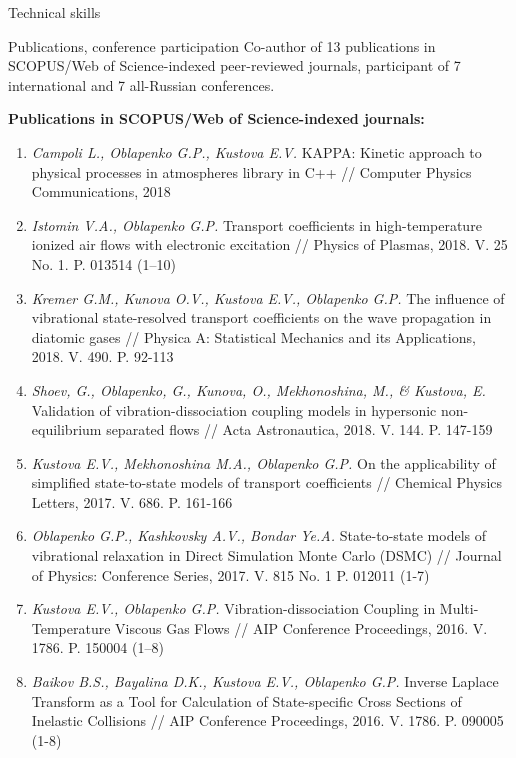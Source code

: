 \documentclass{resume} %
\begin{document}
\begin{rSection}{Technical skills}
\pagebreak

\begin{rSection}{Publications, conference participation}
Co-author of 13 publications in SCOPUS/Web of Science-indexed peer-reviewed journals, participant of 7 international and 7 all-Russian conferences.

{\bf Publications in SCOPUS/Web of Science-indexed journals:}

\begin{enumerate}
\item \emph{Campoli L., Oblapenko G.P., Kustova E.V.} KAPPA: Kinetic approach to physical processes in atmospheres library in C++ // Computer Physics Communications, 2018

\item \emph{Istomin V.A., Oblapenko G.P.} Transport coefficients in high-temperature ionized air flows with electronic excitation // Physics of Plasmas, 2018. V. 25 No. 1. P. 013514 (1--10)

\item \emph{Kremer G.M., Kunova O.V., Kustova E.V., Oblapenko G.P.} The influence of vibrational state-resolved transport coefficients on the wave propagation in diatomic gases // Physica A: Statistical Mechanics and its Applications, 2018. V. 490. P. 92-113

\item \emph{Shoev, G., Oblapenko, G., Kunova, O., Mekhonoshina, M., \& Kustova, E.} Validation of vibration-dissociation coupling models in hypersonic non-equilibrium separated flows // Acta Astronautica, 2018. V. 144. P. 147-159

\item \emph{Kustova E.V., Mekhonoshina M.A., Oblapenko G.P.} On the applicability of simplified state-to-state models of transport coefficients // Chemical Physics Letters, 2017. V. 686. P. 161-166

\item \emph{Oblapenko G.P., Kashkovsky A.V., Bondar Ye.A.} State-to-state models of vibrational relaxation in Direct Simulation Monte Carlo (DSMC) // Journal of Physics: Conference Series, 2017. V. 815 No. 1 P. 012011 (1-7)

\item  \emph{Kustova E.V., Oblapenko G.P.} Vibration-dissociation Coupling in Multi-Temperature Viscous Gas Flows // AIP Conference Proceedings, 2016. V. 1786. P. 150004 (1–8)

\item  \emph{Baikov B.S., Bayalina D.K., Kustova E.V., Oblapenko G.P.} Inverse Laplace Transform as a Tool for Calculation of State-specific Cross Sections of Inelastic Collisions // AIP Conference Proceedings, 2016. V. 1786. P. 090005 (1-8)


\end{enumerate}
\end{rSection}
\end{rSection}
\end{document}
